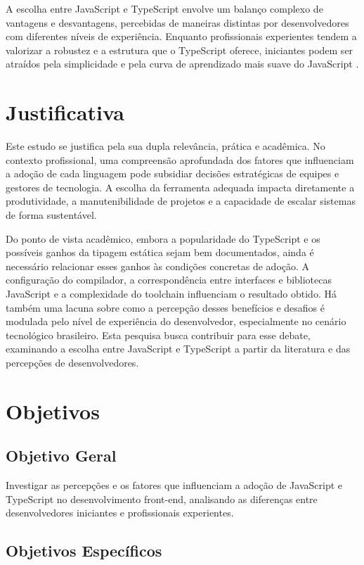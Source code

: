 A escolha entre JavaScript e TypeScript envolve um balanço complexo de vantagens e desvantagens, percebidas de maneiras distintas por desenvolvedores com diferentes níveis de experiência. Enquanto profissionais experientes tendem a valorizar a robustez e a estrutura que o TypeScript oferece, iniciantes podem ser atraídos pela simplicidade e pela curva de aprendizado mais suave do JavaScript \cite{shrestha2022}.

\section{Justificativa}

Este estudo se justifica pela sua dupla relevância, prática e acadêmica. No contexto profissional, uma compreensão aprofundada dos fatores que influenciam a adoção de cada linguagem pode subsidiar decisões estratégicas de equipes e gestores de tecnologia. A escolha da ferramenta adequada impacta diretamente a produtividade, a manutenibilidade de projetos e a capacidade de escalar sistemas de forma sustentável.

Do ponto de vista acadêmico, embora a popularidade do TypeScript e os possíveis ganhos da tipagem estática sejam bem documentados, ainda é necessário relacionar esses ganhos às condições concretas de adoção. A configuração do compilador, a correspondência entre interfaces e bibliotecas JavaScript e a complexidade do toolchain influenciam o resultado obtido. Há também uma lacuna sobre como a percepção desses benefícios e desafios é modulada pelo nível de experiência do desenvolvedor, especialmente no cenário tecnológico brasileiro. Esta pesquisa busca contribuir para esse debate, examinando a escolha entre JavaScript e TypeScript a partir da literatura e das percepções de desenvolvedores.

\section{Objetivos}

\subsection{Objetivo Geral}

Investigar as percepções e os fatores que influenciam a adoção de JavaScript e TypeScript no desenvolvimento front-end, analisando as diferenças entre desenvolvedores iniciantes e profissionais experientes.

\subsection{Objetivos Específicos}

